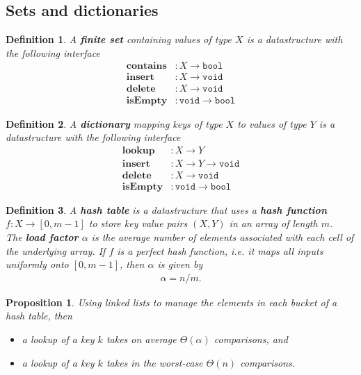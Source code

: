 \documentclass{article}
\theoremstyle{sltheorem}
\newtheorem{definition}{Definition}[section]
\newtheorem{proposition}[theorem]{Proposition}
\newcommand*\B[1]{\textbf{#1}}
\begin{document}
\subsection{Sets and dictionaries}
\begin{definition}
	A \B{finite set} containing values of type $X$ is a datastructure with the following interface
	\begin{align*}
		\textbf{contains} &: X\to \texttt{bool}\\
		\textbf{insert} &: X \to \texttt{void}\\
		\textbf{delete} &: X \to \texttt{void}\\
		\textbf{isEmpty} &: \texttt{void} \to \texttt{bool}
	\end{align*}
\end{definition}
\begin{definition}
	A \B{dictionary} mapping keys of type $X$ to values of type $Y$
	is a datastructure with the following interface
	\begin{align*}
		\textbf{lookup} &: X \to Y\\
		\textbf{insert} &: X \to Y \to \texttt{void}\\
		\textbf{delete} &: X \to \texttt{void}\\
		\textbf{isEmpty} &: \texttt{void} \to \texttt{bool}
	\end{align*}
\end{definition}
\begin{definition}
	A \B{hash table} is a datastructure that uses a \B{hash function} $f: X \to [0,m-1]$
	to store key value pairs $(X,Y)$ in an array of length $m$.\\
	The \B{load factor} $\alpha$ is the average number of elements associated with each cell
	of the underlying array. If $f$ is a perfect hash function, i.e. it maps all inputs uniformly
	onto $[0,m-1]$, then $\alpha$ is given by 
	\begin{align*}
		\alpha = n / m.
	\end{align*}
\end{definition}
\begin{proposition}
	Using linked lists to manage the elements in each bucket of a hash table, then
	\begin{itemize}
		\item a lookup of a key $k$  takes on average $\Theta(\alpha)$ comparisons, and
		\item a lookup of a key $k$ takes in the worst-case $\Theta(n)$ comparisons.
	\end{itemize}
\end{proposition}
\end{document}
